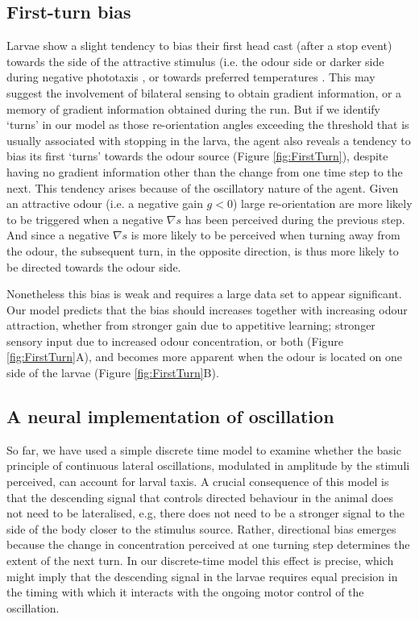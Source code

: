 \documentclass[11pt,a4paper]{article}
\begin{document}
\subsection{First-turn bias}
Larvae show a slight tendency to bias their first head cast (after a stop event) towards the side of the attractive stimulus (i.e. the odour side \citep{gomez2011active,gomez2012active} or darker side during negative phototaxis \citep{kane2013sensorimotor}, or towards preferred temperatures \citep{luo2010navigational}. This may suggest the involvement of bilateral sensing to obtain gradient information, or a memory of gradient information obtained during the run. But if we identify ‘turns’ in our model as those re-orientation angles exceeding the threshold that is usually associated with stopping in the larva, the agent also reveals a tendency to bias its first `turns' towards the odour source (Figure \ref{fig:FirstTurn}), despite having no gradient information other than the change from one time step to the next. This tendency arises because of the oscillatory nature of the agent. Given an attractive odour (i.e. a negative gain $g<0$) large re-orientation are more likely to be triggered when a negative $\nabla s$ has been perceived during the previous step. And since a negative $\nabla s$ is more likely to be perceived when turning away from the odour, the subsequent turn, in the opposite direction, is thus more likely to be directed towards the odour side. 

Nonetheless this bias is weak and requires a large data set to appear significant. Our model predicts that the bias should increases together with increasing odour attraction, whether from stronger gain due to appetitive learning; stronger sensory input due to increased odour concentration, or both (Figure \ref{fig:FirstTurn}A), and becomes more apparent when the odour is located on one side of the larvae (Figure \ref{fig:FirstTurn}B).

\subsection{A neural implementation of oscillation}
So far, we have used a simple discrete time model to examine whether the basic principle of continuous lateral oscillations, modulated in amplitude by the stimuli perceived, can account for larval taxis.
 A crucial consequence of this model is that the descending signal that controls directed behaviour in the animal does not need to be lateralised, e.g, there does not need to be a stronger signal to the side of the body closer to the stimulus source. Rather, directional bias emerges because the change in concentration perceived at one turning step determines the extent of the next turn.
  In our discrete-time model this effect is precise, which might imply that the descending signal in the larvae requires equal precision in the timing with which it interacts with the ongoing motor control of the oscillation.
\end{document}
